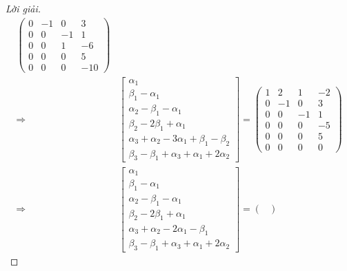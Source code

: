 \documentclass[class=linear-algebra,crop=false]{standalone}
\begin{document}
\begin{proof}[Lời giải]
\begin{align*}
\begin{pmatrix}
            0 & -1 & 0  & 3   \\
            0 & 0  & -1 & 1   \\
            0 & 0  & 1  & -6  \\
            0 & 0  & 0  & 5   \\
            0 & 0  & 0  & -10
        \end{pmatrix}                \\
        \Longrightarrow &
        \begin{bmatrix}
            \alpha_{1}                                                    \\
            \beta_{1} - \alpha_{1}                                        \\
            \alpha_{2} - \beta_{1} - \alpha_{1}                           \\
            \beta_{2} - 2\beta_{1} + \alpha_{1}                           \\
            \alpha_{3} + \alpha_{2} - 3\alpha_{1} + \beta_{1} - \beta_{2} \\
            \beta_{3} - \beta_{1} + \alpha_{3} + \alpha_{1} + 2\alpha_{2}
        \end{bmatrix}=
        \begin{pmatrix}
            1 & 2  & 1  & -2 \\
            0 & -1 & 0  & 3  \\
            0 & 0  & -1 & 1  \\
            0 & 0  & 0  & -5 \\
            0 & 0  & 0  & 5  \\
            0 & 0  & 0  & 0
        \end{pmatrix}                 \\
        \Longrightarrow &
        \begin{bmatrix}
            \alpha_{1}                                        \\
            \beta_{1} - \alpha_{1}                            \\
            \alpha_{2} - \beta_{1} - \alpha_{1}               \\
            \beta_{2} - 2\beta_{1} + \alpha_{1}               \\
            \alpha_{3} + \alpha_{2} - 2\alpha_{1} - \beta_{1} \\
            \beta_{3} - \beta_{1} + \alpha_{3} + \alpha_{1} + 2\alpha_{2}
        \end{bmatrix}=
        \begin{pmatrix}

\end{pmatrix}
\end{align*}
\end{proof}
\end{document}

